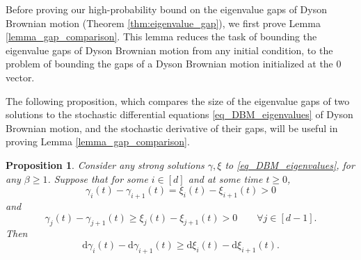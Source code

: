 \documentclass[11pt,letterpaper]{article}
\newtheorem{proposition}[theorem]{Proposition}
\begin{document}
Before proving our high-probability bound on the eigenvalue gaps of Dyson Brownian motion (Theorem \ref{thm:eigenvalue_gap}), we first prove Lemma \ref{lemma_gap_comparison}.
%
This lemma reduces the task of bounding the eigenvalue gaps of Dyson Brownian motion from any initial condition, to the problem of bounding the gaps of a Dyson Brownian motion initialized at the $0$ vector.

The following proposition, which compares the size of the eigenvalue gaps of two solutions to the stochastic differential equations \eqref{eq_DBM_eigenvalues} of Dyson Brownian motion, and the stochastic derivative of their gaps, will be useful in proving Lemma \ref{lemma_gap_comparison}.
\begin{proposition}\label{prop_stochastic_derivative_comparison}
Consider any strong solutions $\gamma, \xi$ to \eqref{eq_DBM_eigenvalues}, for any $\beta \geq 1$. 
%
Suppose that for some $i \in [d]$ and at some time $t \geq 0$,
%
\begin{equation} \label{eq_z3}
\gamma_i(t) - \gamma_{i+1}(t) = \xi_i(t) - \xi_{i+1}(t) >0
\end{equation}
and
\begin{equation}  \label{eq_z4}
\gamma_j(t) - \gamma_{j+1}(t) \geq \xi_j(t) - \xi_{j+1}(t) > 0 \qquad \forall j \in [d-1].
\end{equation}
%
Then
%
\begin{equation}  \label{eq_z5}
\mathrm{d} \gamma_i(t) - \mathrm{d}  \gamma_{i+1}(t) \geq \mathrm{d} \xi_i(t) - \mathrm{d}  \xi_{i+1}(t).
\end{equation}


\end{proposition}
\end{document}
